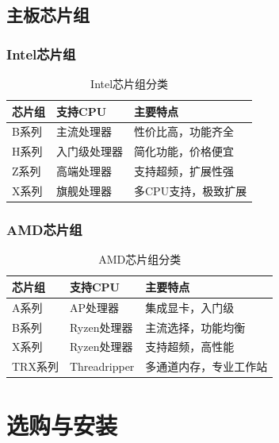 \documentclass[12pt,UTF8]{ctexbook}
\begin{document}
\chapter{主板芯片组}

\section{Intel芯片组}

\begin{table}[H]
    \centering
    \begin{tabular}{|p{2cm}|p{3cm}|p{6cm}|}
        \hline
        \textbf{芯片组} & \textbf{支持CPU} & \textbf{主要特点} \\
        \hline
        B系列 & 主流处理器 & 性价比高，功能齐全 \\
        \hline
        H系列 & 入门级处理器 & 简化功能，价格便宜 \\
        \hline
        Z系列 & 高端处理器 & 支持超频，扩展性强 \\
        \hline
        X系列 & 旗舰处理器 & 多CPU支持，极致扩展 \\
        \hline
    \end{tabular}
    \caption{Intel芯片组分类}
    \label{tab:intel_chipsets}
\end{table}

\section{AMD芯片组}

\begin{table}[H]
    \centering
    \begin{tabular}{|p{2cm}|p{3cm}|p{6cm}|}
        \hline
        \textbf{芯片组} & \textbf{支持CPU} & \textbf{主要特点} \\
        \hline
        A系列 & AP处理器 & 集成显卡，入门级 \\
        \hline
        B系列 & Ryzen处理器 & 主流选择，功能均衡 \\
        \hline
        X系列 & Ryzen处理器 & 支持超频，高性能 \\
        \hline
        TRX系列 & Threadripper & 多通道内存，专业工作站 \\
        \hline
    \end{tabular}
    \caption{AMD芯片组分类}
    \label{tab:amd_chipsets}
\end{table}

\part{选购与安装}
\end{document}
